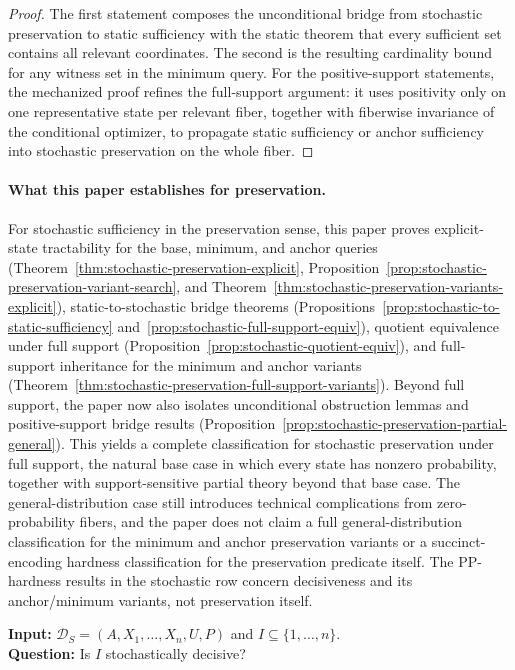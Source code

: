 \begin{proof}
The first statement composes the unconditional bridge from stochastic preservation to static sufficiency with the static theorem that every sufficient set contains all relevant coordinates. The second is the resulting cardinality bound for any witness set in the minimum query. For the positive-support statements, the mechanized proof refines the full-support argument: it uses positivity only on one representative state per relevant fiber, together with fiberwise invariance of the conditional optimizer, to propagate static sufficiency or anchor sufficiency into stochastic preservation on the whole fiber.
\end{proof}

\paragraph{What this paper establishes for preservation.}
For stochastic sufficiency in the preservation sense, this paper proves explicit-state tractability for the base, minimum, and anchor queries (Theorem~\ref{thm:stochastic-preservation-explicit}, Proposition~\ref{prop:stochastic-preservation-variant-search}, and Theorem~\ref{thm:stochastic-preservation-variants-explicit}), static-to-stochastic bridge theorems (Propositions~\ref{prop:stochastic-to-static-sufficiency} and~\ref{prop:stochastic-full-support-equiv}), quotient equivalence under full support (Proposition~\ref{prop:stochastic-quotient-equiv}), and full-support inheritance for the minimum and anchor variants (Theorem~\ref{thm:stochastic-preservation-full-support-variants}). Beyond full support, the paper now also isolates unconditional obstruction lemmas and positive-support bridge results (Proposition~\ref{prop:stochastic-preservation-partial-general}). This yields a complete classification for stochastic preservation under full support, the natural base case in which every state has nonzero probability, together with support-sensitive partial theory beyond that base case. The general-distribution case still introduces technical complications from zero-probability fibers, and the paper does not claim a full general-distribution classification for the minimum and anchor preservation variants or a succinct-encoding hardness classification for the preservation predicate itself. The PP-hardness results in the stochastic row concern decisiveness and its anchor/minimum variants, not preservation itself.

\begin{problem}\label{prob:stochastic-singleton-sufficiency}
\textbf{Input:} $\mathcal{D}_S=(A,X_1,\ldots,X_n,U,P)$ and $I\subseteq\{1,\ldots,n\}$. \\
\textbf{Question:} Is $I$ stochastically decisive?
\end{problem}

